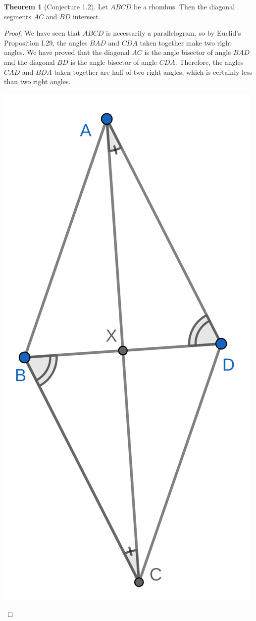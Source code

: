 \documentclass{tufte-handout}
\theoremstyle{definition}
\newtheorem{theorem}{Theorem}[section]
\begin{document}
\begin{theorem}[Conjecture 1.2]\label{theorem:rhombus-diags-meet}
Let $ABCD$ be a rhombus. Then the diagonal segments $AC$ and $BD$ intersect.
\end{theorem}

\begin{proof}
We have seen that $ABCD$ is necessarily a parallelogram, so by Euclid's Proposition I.29, the angles $BAD$ and $CDA$ taken together make two right angles. We have proved that the diagonal $AC$ is the angle bisector of angle $BAD$ and the diagonal $BD$ is the angle bisector of angle $CDA$. Therefore, the angles $CAD$ and $BDA$ taken together are half of two right angles, which is certainly less than two right angles.

\begin{marginfigure}[-0.75in]
  \includegraphics{images/rhombus_diag_meet.png}

\end{marginfigure}
\end{proof}
\end{document}
